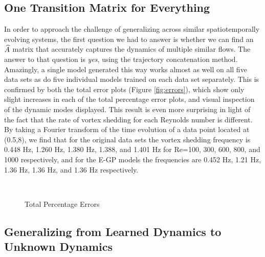 \subsection{One Transition Matrix for Everything}\label{sec:lotr}

In order to approach the challenge of generalizing across similar spatiotemporally evolving systems, the first question we had to answer is whether we can find an $\widehat{A}$ matrix that accurately captures the dynamics of multiple similar flows. The answer to that question is \textit{yes}, using the trajectory concatenation method. Amazingly, a single model generated this way works almost as well on all five data sets as do five individual models trained on each data set separately. This is confirmed by both the total error plots (Figure \ref{fig:errors}), which show only slight increases in each of the total percentage error plots, and visual inspection of the dynamic modes displayed. This result is even more surprising in light of the fact that the rate of vortex shedding for each Reynolds number is different. By taking a Fourier transform of the time evolution of a data point located at (0.5,8), we find that for the original data sets the vortex shedding frequency is 0.448 Hz, 1.260 Hz, 1.380 Hz, 1.388, and 1.401 Hz for Re=100, 300, 600, 800, and 1000 respectively, and for the E-GP models the frequencies are 0.452 Hz, 1.21 Hz, 1.36 Hz, 1.36 Hz, and 1.36 Hz respectively.

\begin{figure}[h] %
	\centering
	\\
	\caption{Total Percentage Errors}
\end{figure}

\subsection{Generalizing from Learned Dynamics to Unknown Dynamics}\label{sec:generalize}


